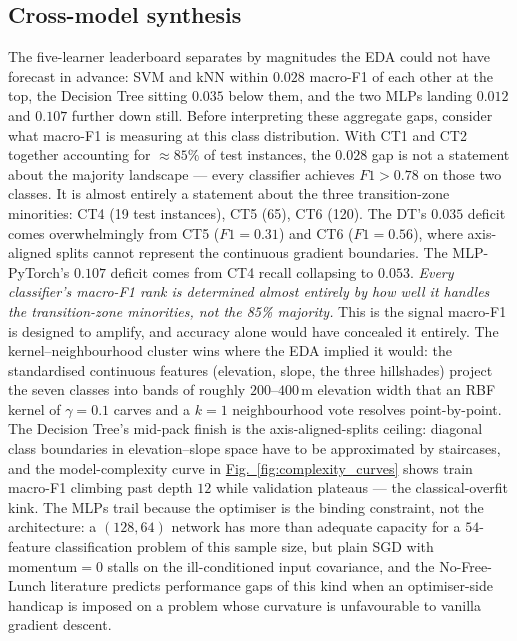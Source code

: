 \documentclass[conference]{IEEEtran}
\newcommand{\figref}[1]{\hyperref[#1]{\textcolor{denim_comp}{Fig.~\ref*{#1}}}}
\begin{document}
\subsection{Cross-model synthesis}\label{sec:disc:synthesis}
The five-learner leaderboard separates by magnitudes the EDA could not have
forecast in advance: SVM and kNN within $0.028$ macro-F1 of each other at the
top, the Decision Tree sitting $0.035$ below them, and the two MLPs landing
$0.012$ and $0.107$ further down still.
Before interpreting these aggregate gaps, consider what macro-F1 is measuring
at this class distribution.
With CT1 and CT2 together accounting for ${\approx}85\%$ of test instances,
the $0.028$ gap is not a statement about the majority landscape --- every
classifier achieves $F1{>}0.78$ on those two classes.
It is almost entirely a statement about the three transition-zone minorities:
CT4 (19 test instances), CT5 (65), CT6 (120).
The DT's $0.035$ deficit comes overwhelmingly from CT5 ($F1{=}0.31$) and CT6
($F1{=}0.56$), where axis-aligned splits cannot represent the continuous
gradient boundaries.
The MLP-PyTorch's $0.107$ deficit comes from CT4 recall collapsing to $0.053$.
\emph{Every classifier's macro-F1 rank is determined almost entirely by how
well it handles the transition-zone minorities, not the 85\% majority.}
This is the signal macro-F1 is designed to amplify, and accuracy alone would
have concealed it entirely.
The kernel--neighbourhood cluster wins where the EDA implied it would: the standardised continuous features
(elevation, slope, the three hillshades) project the seven classes into bands
of roughly $200$--$400$\,m elevation width that an RBF kernel of $\gamma{=}0.1$
carves and a $k{=}1$ neighbourhood vote resolves point-by-point. The Decision
Tree's mid-pack finish is the axis-aligned-splits ceiling: diagonal class
boundaries in elevation--slope space have to be approximated by staircases,
and the model-complexity curve in \figref{fig:complexity_curves} shows train
macro-F1 climbing past depth $12$ while validation plateaus --- the
classical-overfit kink. The MLPs trail because the optimiser is the binding
constraint, not the architecture: a $(128, 64)$ network has more than
adequate capacity for a $54$-feature classification problem of this sample
size, but plain SGD with $\mathrm{momentum}{=}0$ stalls on the ill-conditioned
input covariance, and the No-Free-Lunch literature
\cite{wolpert1996nfl,ruder2017overview} predicts performance gaps of this
kind when an optimiser-side handicap is imposed on a problem whose curvature
is unfavourable to vanilla gradient descent.
\end{document}

